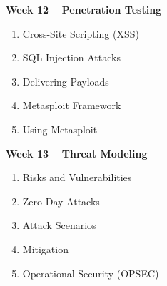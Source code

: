\documentclass[11pt, a4paper]{article}
\begin{document}
\vspace*{.1in}
\noindent\textbf{Week 12 -- Penetration Testing}
\begin{enumerate}
\item Cross-Site Scripting (XSS)
\item SQL Injection Attacks
\item Delivering Payloads
\item Metasploit Framework
\item Using Metasploit %
\end{enumerate}

\vspace*{.1in}
\noindent\textbf{Week 13 -- Threat Modeling}
\begin{enumerate}
\item Risks and Vulnerabilities
\item Zero Day Attacks
\item Attack Scenarios
\item Mitigation
\item Operational Security (OPSEC)
\end{enumerate}

\end{document}
